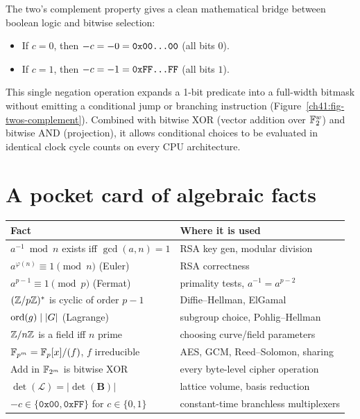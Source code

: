 The two's complement property gives a clean mathematical bridge between boolean logic
and bitwise selection:
\begin{itemize}
  \item If $c = 0$, then $-c = -0 = \texttt{0x00\dots00}$ (all bits $0$).
  \item If $c = 1$, then $-c = -1 = \texttt{0xFF\dots FF}$ (all bits $1$).
\end{itemize}

This single negation operation expands a 1-bit predicate into a full-width bitmask
without emitting a conditional jump or branching instruction (Figure~\ref{ch41:fig-twos-complement}).
Combined with bitwise XOR (vector addition over $\mathbb{F}_2^w$) and bitwise AND (projection),
it allows conditional choices to be evaluated in identical clock cycle counts on every
CPU architecture.

\section{A pocket card of algebraic facts}
\label{ch41:card}

\begin{center}
\renewcommand{\arraystretch}{1.25}
\begin{tabular}{@{}p{}p{}@{}}
\toprule
\textbf{Fact} & \textbf{Where it is used} \\
\midrule
$a^{-1} \bmod n$ exists iff $\gcd(a,n)=1$ & RSA key gen, modular division \\
$a^{\varphi(n)}\equiv 1 \pmod n$ (Euler) & RSA correctness \\
$a^{p-1}\equiv 1 \pmod p$ (Fermat) & primality tests, $a^{-1}=a^{p-2}$ \\
$(\mathbb{Z}/p\mathbb{Z})^{*}$ is cyclic of order $p-1$ & Diffie--Hellman, ElGamal \\
$\operatorname{ord}(g) \mid \lvert G\rvert$ (Lagrange) & subgroup choice, Pohlig--Hellman \\
$\mathbb{Z}/n\mathbb{Z}$ is a field iff $n$ prime & choosing curve/field parameters \\
$\mathbb{F}_{p^m}=\mathbb{F}_p[x]/(f)$, $f$ irreducible & AES, GCM, Reed--Solomon, sharing \\
Add in $\mathbb{F}_{2^m}$ is bitwise XOR & every byte-level cipher operation \\
$\det(\mathcal{L}) = |\det(\mathbf{B})|$ & lattice volume, basis reduction \\
$-c \in \{\texttt{0x00}, \texttt{0xFF}\}$ for $c \in \{0,1\}$ & constant-time branchless multiplexers \\
\bottomrule
\end{tabular}
\end{center}

